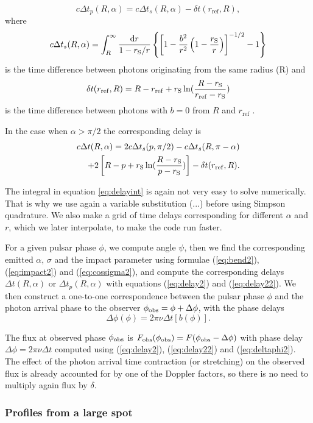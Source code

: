 \documentclass{wihuri}
\def\rg{r_{\rm S}} %
\def\be{\begin{equation}}
\def\ee{\end{equation}}
\def\d{{\rm d}}
\def\rg{r_{\rm S}} %
\def\phiobs{\phi_{\rm obs}}
\begin{document}
\be \label{eq:delay2}
c\Delta t_{p}(R,\alpha)=  c\Delta t_{s}(R,\alpha) -\delta t(r_{\mathrm{ref}},R),
\ee
where 
\be \label{eq:delayint}
c\Delta t_{s}(R,\alpha) =
\int_R^{\infty} \frac{\d r}{1- \rg/r}
\left\{ \left[ 1-  \frac{b^2}{r^2}  \left( 1- \frac{\rg}{r} \right)
\right] ^{-1/2}  -1 \right\}
\ee
is the time difference between photons originating from the same radius (R) and
\be
\delta t(r_{\mathrm{ref}},R) = R-r_{\mathrm{ref}}+\rg\ln(\frac{R-\rg}{r_{\mathrm{ref}}-\rg})
\ee
is the time difference between photons with $b=0$ from $R$ and $r_{\mathrm{ref}}$ \cite{falkner}. 

In the case when $\alpha > \pi/2$ the corresponding delay is
\be\label{eq:delay22}
\begin{split}
c\Delta t(R,\alpha)= 2c\Delta t_{s}(p,\pi/2)-c\Delta t_{s}(R,\pi-\alpha)\\+2\left[ R-p+\rg\ln(\frac{R-\rg}{p-\rg})\right]-\delta t(r_{\mathrm{ref}},R).
\end{split}
\ee

The integral in equation \ref{eq:delayint} is again not very easy to solve numerically. That is why we use again a variable substitution (...) before using Simpson quadrature. We also make a grid of time delays corresponding for different $\alpha$ and $r$, which we later interpolate, to make the code run faster.

For a given pulsar phase $\phi$, we compute angle $\psi$, then
we find the corresponding emitted $\alpha$, $\sigma$ and the impact parameter
using  formulae (\ref{eq:bend2}), (\ref{eq:impact2}) and (\ref{eq:cossigma2}), and
  compute the corresponding  delays $\Delta t(R,\alpha)$ or $\Delta t_{p}(R,\alpha)$
with equations  (\ref{eq:delay2}) and (\ref{eq:delay22}).
We then construct a one-to-one
correspondence between the pulsar phase $\phi$ and
the photon arrival phase to the observer $\phiobs=\phi+ \Delta\phi$,
with the phase delays
\be \label{eq:deltaphi2}
\Delta \phi(\phi) =2\pi\nu \Delta t[b(\phi)] .
\ee

The flux at observed phase $\phiobs$ is
${F}_{\rm obs}(\phiobs)=F(\phiobs-\Delta\phi)$ with
phase delay  $\Delta \phi=2\pi\nu\Delta t$
computed using (\ref{eq:delay2}), (\ref{eq:delay22}) and (\ref{eq:deltaphi2}).
The effect of the photon arrival time contraction (or stretching) on
the observed flux is already accounted for by one of the Doppler factors, 
so there is no need to multiply again flux by $\delta$.



\subsubsection{Profiles from a large spot} 
\end{document}
